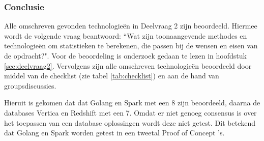 \subsubsection{\textbf{Conclusie}}

Alle omschreven gevonden technologieën in Deelvraag 2 zijn beoordeeld. Hiermee wordt de volgende vraag beantwoord: ``Wat zijn toonaangevende methodes en technologieën om statistieken te berekenen, die passen bij de wensen en eisen van de opdracht?". Voor de beoordeling is onderzoek gedaan te lezen in hoofdstuk \ref{sec:deelvraag2}. Vervolgens zijn alle omschreven technologieën beoordeeld door middel van de checklist (zie tabel \ref{tab:checklist}) en aan de hand van groupsdiscussies.

Hieruit is gekomen dat dat Golang en Spark met een 8 zijn beoordeeld, daarna de databases Vertica en Redshift met een 7. Omdat er niet genoeg consensus is over het toepassen van een database oplossingen wordt deze niet getest. Dit betekend dat Golang en Spark worden getest in een tweetal Proof of Concept 's.